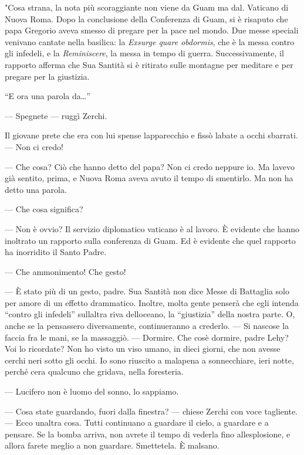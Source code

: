 "Cosa strana, la nota più scoraggiante non viene da Guam ma dal.
Vaticano di Nuova Roma. Dopo la conclusione della Conferenza di Guam, si
è risaputo che papa Gregorio aveva smesso di pregare per la pace nel
mondo. Due messe speciali venivano cantate nella basilica: la
\emph{Exsurge quare obdormis}, che è la messa contro gli infedeli, e la
\emph{Reminiscere}, la messa in tempo di guerra. Successivamente, il
rapporto afferma che Sua Santità si è ritirato sulle montagne per
meditare e per pregare per la giustizia.

``E ora una parola da\ldots''

--- Spegnete --- ruggì Zerchi.

Il giovane prete che era con lui spense l\textquotesingle apparecchio e
fissò l\textquotesingle abate a occhi sbarrati. --- Non ci credo!

--- Che cosa? Ciò che hanno detto del papa? Non ci credo neppure io. Ma
l\textquotesingle avevo già sentito, prima, e Nuova Roma aveva avuto il
tempo di smentirlo. Ma non ha detto una parola.

--- Che cosa significa?

--- Non è ovvio? Il servizio diplomatico vaticano è al lavoro. È
evidente che hanno inoltrato un rapporto sulla conferenza di Guam. Ed è
evidente che quel rapporto ha inorridito il Santo Padre.

--- Che ammonimento! Che gesto!

--- È stato più di un gesto, padre. Sua Santità non dice Messe di
Battaglia solo per amore di un effetto drammatico. Inoltre, molta gente
penserà che egli intenda ``contro gli infedeli''
sull\textquotesingle altra riva dell\textquotesingle oceano, la
``giustizia'' della nostra parte. O, anche se la pensassero
diversamente, continueranno a crederlo. --- Si nascose la faccia fra le
mani, se la massaggiò. --- Dormire. Che cos\textquotesingle è dormire,
padre Lehy? Voi lo ricordate? Non ho visto un viso umano, in dieci
giorni, che non avesse cerchi neri sotto gli occhi. Io sono riuscito a
malapena a sonnecchiare, ieri notte, perché c\textquotesingle era
qualcuno che gridava, nella foresteria.

--- Lucifero non è l\textquotesingle uomo del sonno, lo sappiamo.

--- Cosa state guardando, fuori dalla finestra? --- chiese Zerchi con
voce tagliente. --- Ecco un\textquotesingle altra cosa. Tutti continuano
a guardare il cielo, a guardare e a pensare. Se la bomba arriva, non
avrete il tempo di vederla fino all\textquotesingle esplosione, e allora
farete meglio a non guardare. Smettetela. È malsano.

